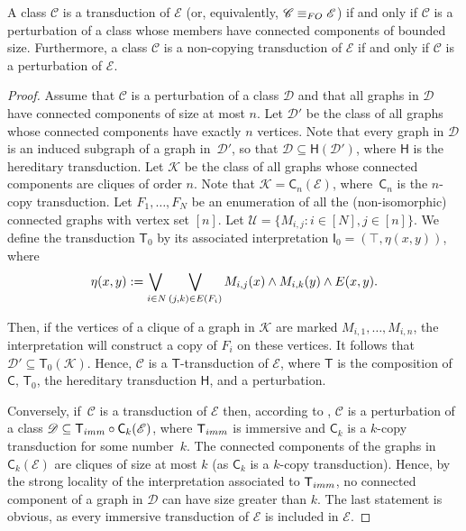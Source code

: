 \documentclass{lmcs}
\newcommand{\Cc}{\mathscr{C}}
\newcommand{\Dd}{\mathscr{D}}
\newcommand{\Ee}{\ensuremath{\mathscr E}}
\renewcommand{\FO}{{\rm FO}}
\theoremstyle{definition}
\begin{document}
\begin{prop}
	\label{lem:Ee}
	A class $\Cc$ is a transduction of $\Ee$ (or, equivalently, $\Cc\equiv_\FO\Ee$) if and only if $\Cc$ is a perturbation of a class whose members have connected components of bounded size. 
	Furthermore, a class $\Cc$ is a non-copying transduction of $\Ee$ if and only if $\Cc$ is a perturbation of $\Ee$.
\end{prop}
\begin{proof}
	Assume that $\Cc$ is a perturbation of a class $\Dd$ and that all graphs in $\Dd$ have connected components of size at most $n$. Let $\Dd'$ be the class of all graphs whose connected components have exactly $n$ vertices.
	Note that every graph in $\Dd$ is an induced subgraph of a graph in~$\Dd'$, so that $\Dd\subseteq\mathsf H(\Dd')$, where $\mathsf H$ is the hereditary transduction. 
	Let $\mathscr K$ be the class of all graphs whose connected components are cliques of order $n$. Note that $\mathscr K=\mathsf C_n(\Ee)$, where~$\mathsf C_n$ is the $n$-copy transduction.
	Let $F_1,\dots,F_N$ be an enumeration of all the (non-isomorphic) connected graphs with vertex set $[n]$.
	Let $\mathcal U=\{M_{i,j}\colon i\in [N], j\in [n]\}$.
	We define the transduction 
	$\mathsf T_0$ by its associated interpretation $\mathsf I_0=(\top,\eta(x,y))$, where 
	\[
		\eta(x,y):=\adjustlimits\bigvee_{i\in N}\bigvee_{(j,k)\in E(F_i)}M_{i,j}(x)\wedge M_{i,k}(y)\wedge E(x,y).
	\]

	Then, if the vertices of a clique of a graph in $\mathscr K$ are marked $M_{i,1},\dots,M_{i,n}$, the interpretation will construct a copy of $F_i$ on these vertices. It follows that 
	$\Dd'\subseteq \mathsf T_0(\mathscr K)$. Hence, $\Cc$ is a $\mathsf T$-transduction of $\Ee$, where $\mathsf T$ is the composition of $\mathsf C$, $\mathsf T_0$, the hereditary transduction $\mathsf H$, and a perturbation.


	Conversely, if~$\Cc$ is a transduction of $\Ee$ then, according to , $\Cc$ is a perturbation of a class $\Dd\subseteq\mathsf T_{\rm imm}\circ \mathsf C_k(\Ee)$, where $\mathsf T_{\rm imm}$ is immersive and $\mathsf C_k$ is a $k$-copy transduction for some number~$k$. 
	The connected components of the graphs in $\mathsf C_k(\Ee)$ are cliques of size at most $k$ (as $\mathsf C_k$ is a $k$-copy transduction). Hence, 
	by the strong locality of the interpretation associated to $\mathsf T_{\rm imm}$, no connected component of a graph in $\Dd$ can have size greater than $k$.
	The last statement is obvious, as every immersive transduction of $\Ee$ is included in $\Ee$.
\end{proof}
\end{document}
